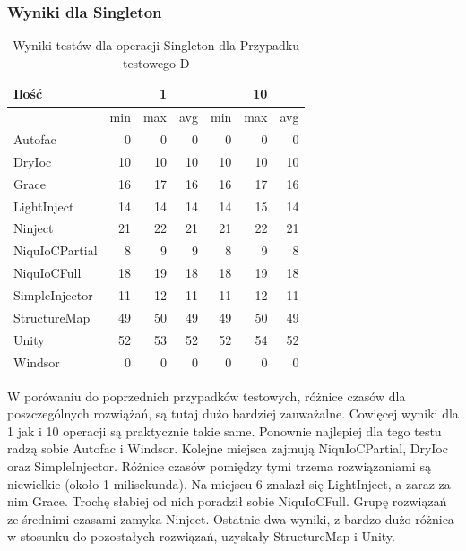 \documentclass[12pt]{article}
\begin{document}
\subsubsection{Wyniki dla Singleton}
\begin{table}[H]
\begin{center}
\begin{small}
	\begin{tabular}{ | l | r r r | r r r | }
    		\hline
Ilość & & 1 & & & 10 & \\ \hline
 & min & max & avg & min & max & avg \\ \hline
Autofac & 0 & 0 & 0 & 0 & 0 & 0 \\ \hline
DryIoc & 10 & 10 & 10 & 10 & 10 & 10 \\ \hline
Grace & 16 & 17 & 16 & 16 & 17 & 16 \\ \hline
LightInject & 14 & 14 & 14 & 14 & 15 & 14 \\ \hline
Ninject & 21 & 22 & 21 & 21 & 22 & 21 \\ \hline
NiquIoCPartial & 8 & 9 & 9 & 8 & 9 & 8 \\ \hline
NiquIoCFull & 18 & 19 & 18 & 18 & 19 & 18 \\ \hline
SimpleInjector & 11 & 12 & 11 & 11 & 12 & 11 \\ \hline
StructureMap & 49 & 50 & 49 & 49 & 50 & 49 \\ \hline
Unity & 52 & 53 & 52 & 52 & 54 & 52 \\ \hline
Windsor & 0 & 0 & 0 & 0 & 0 & 0 \\ \hline
  	\end{tabular}
\end{small}
\end{center}
\caption{Wyniki testów dla operacji Singleton dla Przypadku testowego D}
\label{TestCaseD_Singleton}
\end{table}
W porówaniu do poprzednich przypadków testowych, różnice czasów dla poszczególnych rozwiążań, są tutaj dużo bardziej zauważalne. Cowięcej wyniki dla 1 jak i 10 operacji są praktycznie takie same. Ponownie najlepiej dla tego testu radzą sobie Autofac i Windsor. Kolejne miejsca zajmują NiquIoCPartial, DryIoc oraz SimpleInjector. Różnice czasów pomiędzy tymi trzema rozwiązaniami są niewielkie (około 1 milisekunda). Na miejscu 6 znalazł się LightInject, a zaraz za nim Grace. Trochę słabiej od nich poradził sobie NiquIoCFull. Grupę rozwiązań ze średnimi czasami zamyka Ninject. Ostatnie dwa wyniki, z bardzo dużo różnica w stosunku do pozostałych rozwiązań, uzyskały StructureMap i Unity.
\end{document}
